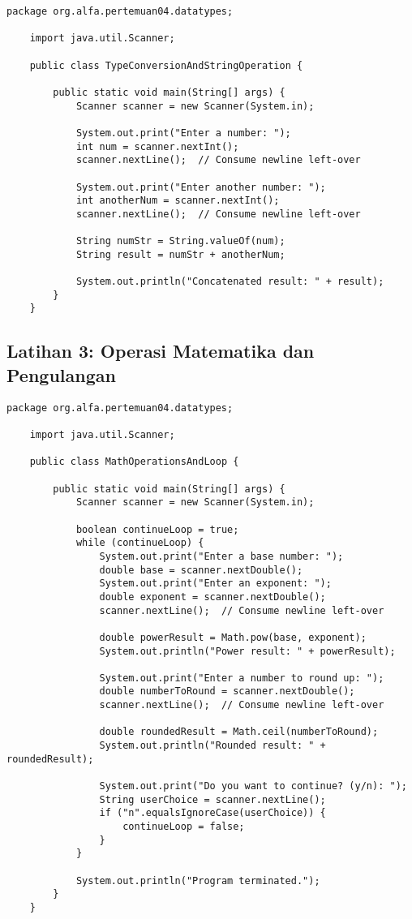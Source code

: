 \begin{lstlisting}[style=JavaStyle, caption={Java Code for Type Conversion and String Operation}]
	package org.alfa.pertemuan04.datatypes;
	
	import java.util.Scanner;
	
	public class TypeConversionAndStringOperation {
		
		public static void main(String[] args) {
			Scanner scanner = new Scanner(System.in);
			
			System.out.print("Enter a number: ");
			int num = scanner.nextInt();
			scanner.nextLine();  // Consume newline left-over
			
			System.out.print("Enter another number: ");
			int anotherNum = scanner.nextInt();
			scanner.nextLine();  // Consume newline left-over
			
			String numStr = String.valueOf(num);
			String result = numStr + anotherNum;
			
			System.out.println("Concatenated result: " + result);
		}
	}
\end{lstlisting}

\subsection{Latihan 3: Operasi Matematika dan Pengulangan}

\begin{lstlisting}[style=JavaStyle, caption={Java Code for Math Operations and Loop}]
	package org.alfa.pertemuan04.datatypes;
	
	import java.util.Scanner;
	
	public class MathOperationsAndLoop {
		
		public static void main(String[] args) {
			Scanner scanner = new Scanner(System.in);
			
			boolean continueLoop = true;
			while (continueLoop) {
				System.out.print("Enter a base number: ");
				double base = scanner.nextDouble();
				System.out.print("Enter an exponent: ");
				double exponent = scanner.nextDouble();
				scanner.nextLine();  // Consume newline left-over
				
				double powerResult = Math.pow(base, exponent);
				System.out.println("Power result: " + powerResult);
				
				System.out.print("Enter a number to round up: ");
				double numberToRound = scanner.nextDouble();
				scanner.nextLine();  // Consume newline left-over
				
				double roundedResult = Math.ceil(numberToRound);
				System.out.println("Rounded result: " + roundedResult);
				
				System.out.print("Do you want to continue? (y/n): ");
				String userChoice = scanner.nextLine();
				if ("n".equalsIgnoreCase(userChoice)) {
					continueLoop = false;
				}
			}
			
			System.out.println("Program terminated.");
		}
	}
\end{lstlisting}

